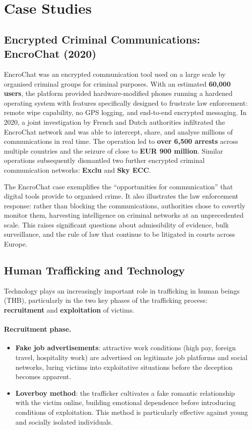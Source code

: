 \documentclass[11pt,a4paper,openany]{report}
\theoremstyle{definition}
\theoremstyle{plain}
\theoremstyle{remark}
\begin{document}
\section{Case Studies}

\subsection{Encrypted Criminal Communications: EncroChat (2020)}

EncroChat was an encrypted communication tool used on a large scale by organised criminal groups for criminal purposes. With an estimated \textbf{60,000 users}, the platform provided hardware-modified phones running a hardened operating system with features specifically designed to frustrate law enforcement: remote wipe capability, no GPS logging, and end-to-end encrypted messaging. In 2020, a joint investigation by French and Dutch authorities infiltrated the EncroChat network and was able to intercept, share, and analyse millions of communications in real time. The operation led to \textbf{over 6,500 arrests} across multiple countries and the seizure of close to \textbf{EUR 900 million}. Similar operations subsequently dismantled two further encrypted criminal communication networks: \textbf{Exclu} and \textbf{Sky ECC}.

The EncroChat case exemplifies the ``opportunities for communication'' that digital tools provide to organised crime. It also illustrates the law enforcement response: rather than blocking the communications, authorities chose to covertly monitor them, harvesting intelligence on criminal networks at an unprecedented scale. This raises significant questions about admissibility of evidence, bulk surveillance, and the rule of law that continue to be litigated in courts across Europe.

\subsection{Human Trafficking and Technology}

Technology plays an increasingly important role in trafficking in human beings (THB), particularly in the two key phases of the trafficking process: \textbf{recruitment} and \textbf{exploitation} of victims.

\paragraph{Recruitment phase.}
\begin{itemize}
    \item \textbf{Fake job advertisements}: attractive work conditions (high pay, foreign travel, hospitality work) are advertised on legitimate job platforms and social networks, luring victims into exploitative situations before the deception becomes apparent.
    \item \textbf{Loverboy method}: the trafficker cultivates a fake romantic relationship with the victim online, building emotional dependence before introducing conditions of exploitation. This method is particularly effective against young and socially isolated individuals.
\end{itemize}
\end{document}
